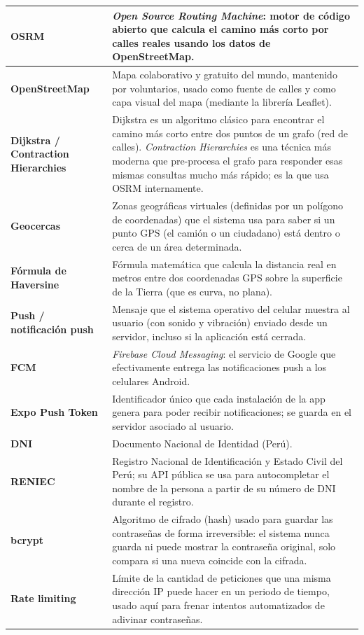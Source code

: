 \documentclass[11pt,a4paper]{article}
\begin{document}
\begin{longtable}{|p{3.2cm}|p{11cm}|}
\hline
\textbf{OSRM} & \textit{Open Source Routing Machine}: motor de código abierto que calcula el camino más corto por calles reales usando los datos de OpenStreetMap. \\
\hline
\textbf{OpenStreetMap} & Mapa colaborativo y gratuito del mundo, mantenido por voluntarios, usado como fuente de calles y como capa visual del mapa (mediante la librería Leaflet). \\
\hline
\textbf{Dijkstra / Contraction Hierarchies} & Dijkstra es un algoritmo clásico para encontrar el camino más corto entre dos puntos de un grafo (red de calles). \textit{Contraction Hierarchies} es una técnica más moderna que pre-procesa el grafo para responder esas mismas consultas mucho más rápido; es la que usa OSRM internamente. \\
\hline
\textbf{Geocercas} & Zonas geográficas virtuales (definidas por un polígono de coordenadas) que el sistema usa para saber si un punto GPS (el camión o un ciudadano) está dentro o cerca de un área determinada. \\
\hline
\textbf{Fórmula de Haversine} & Fórmula matemática que calcula la distancia real en metros entre dos coordenadas GPS sobre la superficie de la Tierra (que es curva, no plana). \\
\hline
\textbf{Push / notificación push} & Mensaje que el sistema operativo del celular muestra al usuario (con sonido y vibración) enviado desde un servidor, incluso si la aplicación está cerrada. \\
\hline
\textbf{FCM} & \textit{Firebase Cloud Messaging}: el servicio de Google que efectivamente entrega las notificaciones push a los celulares Android. \\
\hline
\textbf{Expo Push Token} & Identificador único que cada instalación de la app genera para poder recibir notificaciones; se guarda en el servidor asociado al usuario. \\
\hline
\textbf{DNI} & Documento Nacional de Identidad (Perú). \\
\hline
\textbf{RENIEC} & Registro Nacional de Identificación y Estado Civil del Perú; su API pública se usa para autocompletar el nombre de la persona a partir de su número de DNI durante el registro. \\
\hline
\textbf{bcrypt} & Algoritmo de cifrado (hash) usado para guardar las contraseñas de forma irreversible: el sistema nunca guarda ni puede mostrar la contraseña original, solo compara si una nueva coincide con la cifrada. \\
\hline
\textbf{Rate limiting} & Límite de la cantidad de peticiones que una misma dirección IP puede hacer en un periodo de tiempo, usado aquí para frenar intentos automatizados de adivinar contraseñas. \\

\end{longtable}
\end{document}
